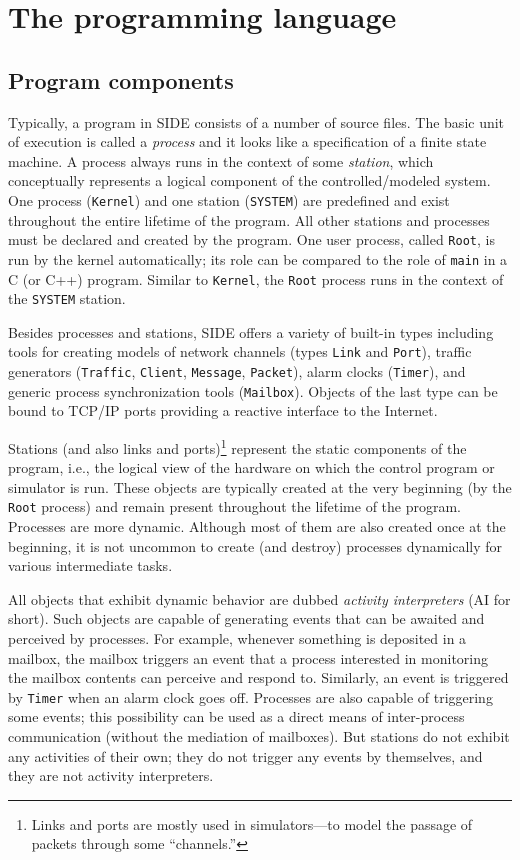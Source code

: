 \section{The programming language}

\subsection{Program components}

Typically, a program in SIDE consists of a number of source files.
The basic unit of execution is called a {\em process\/} and it looks like
a specification of a finite state machine.
A process always runs in the context of some {\em station}, which conceptually
represents a logical component of the controlled/modeled system.
One process ({\tt Kernel}) and one station ({\tt SYSTEM}) are predefined
and exist throughout the entire lifetime of the program.
All other stations and processes must be declared and created by the program.
One user process, called {\tt Root}, is run by the kernel automatically;
its role can be compared to the role of {\tt main} in a C (or C++) program.
Similar to {\tt Kernel}, the {\tt Root} process runs in the context of the
{\tt SYSTEM} station.

Besides processes and stations,
SIDE offers a variety of built-in types including tools for creating
models of network channels (types {\tt Link} and {\tt Port}),
traffic generators ({\tt Traffic}, {\tt Client}, {\tt Message}, {\tt Packet}),
alarm clocks ({\tt Timer}), and generic process synchronization tools
({\tt Mailbox}).
Objects of the last type can be bound to TCP/IP ports providing a 
reactive interface to the Internet.

Stations (and also links and ports)\footnote{Links and ports are mostly used
in simulators---to model the passage of packets through some ``channels.''}
represent the static components of the program, i.e., the logical view
of the hardware on which the control program or simulator is run.
These objects are typically created at the very beginning (by the {\tt Root}
process) and remain present throughout the lifetime of the program.
Processes are more dynamic.
Although most of them are also created once at the beginning, it is not
uncommon to create (and destroy)
processes dynamically for various intermediate tasks.

All objects that exhibit dynamic behavior are dubbed {\em activity
interpreters\/} (AI for short).
Such objects are capable of generating events that can be awaited
and perceived by processes.
For example, whenever something is deposited in a mailbox, the mailbox triggers
an event that a process interested in monitoring the mailbox contents can
perceive and respond to.
Similarly, an event is triggered by {\tt Timer} when an alarm clock goes
off.
Processes are also capable of triggering some events; this possibility can be
used as a direct means of inter-process communication (without the
mediation of mailboxes).
But stations do not exhibit any activities of their own; they do
not trigger any events by themselves, and they are not activity interpreters.


